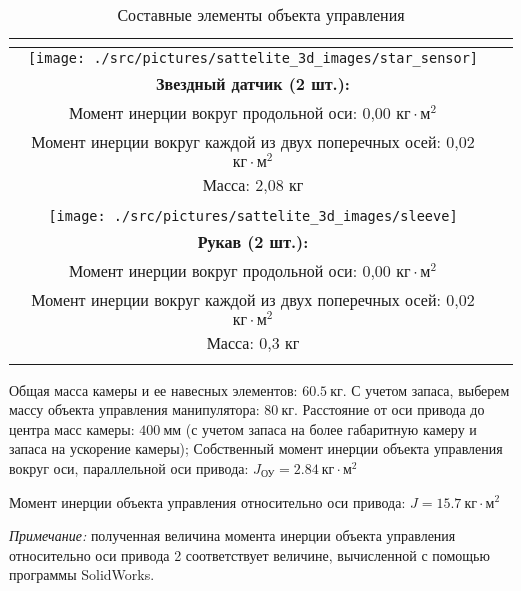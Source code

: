 \begin{table}[h!]
\begin{tabular}{|c|c|}
{            } \\
        \hline
            \texttt{[image: ./src/pictures/sattelite\_3d\_images/star\_sensor]} &
            \shortstack[l] {
                \rule{0pt}{2mm} \\
                \textbf{Звездный датчик (2 шт.):} \\
                Момент инерции вокруг продольной оси: 0,00 $\text{кг} \cdot \text{м}^{2}$ \\
                Момент инерции вокруг каждой из двух поперечных  осей: 0,02 $\text{кг} \cdot \text{м}^{2}$ \\
                Масса: 2,08 кг \\
                \rule{0pt}{2mm}
            } \\
        \hline
            \texttt{[image: ./src/pictures/sattelite\_3d\_images/sleeve]} &
            \shortstack[l] {
                \rule{0pt}{2mm} \\
                \textbf{Рукав (2 шт.):} \\
                Момент инерции вокруг продольной оси: 0,00 $\text{кг} \cdot \text{м}^{2}$ \\
                Момент инерции вокруг каждой из двух поперечных  осей: 0,02 $\text{кг} \cdot \text{м}^{2}$ \\
                Масса: 0,3 кг \\
                \rule{0pt}{2mm}
            } \\
        \hline
    \end{tabular}

    \caption{Составные элементы объекта управления}
\end{table}

Общая масса камеры и ее навесных элементов: $60.5 ~\text{кг}$. С учетом запаса, выберем
массу объекта управления манипулятора: $80 ~\text{кг}$.
Расстояние от оси привода до центра масс камеры: $400 ~\text{мм}$ (с учетом запаса
на более габаритную камеру и запаса на ускорение камеры);
Собственный момент инерции объекта управления вокруг оси, параллельной оси привода:
$ J_{\text{ОУ}} = 2.84 ~\text{кг} \cdot \text{м}^2 $

Момент инерции объекта управления относительно оси привода:
$ J = 15.7 ~\text{кг} \cdot \text{м}^2 $

\textit{Примечание:} полученная величина момента инерции объекта управления относительно оси привода 2 соответствует величине, вычисленной с помощью программы SolidWorks.




\endinput

